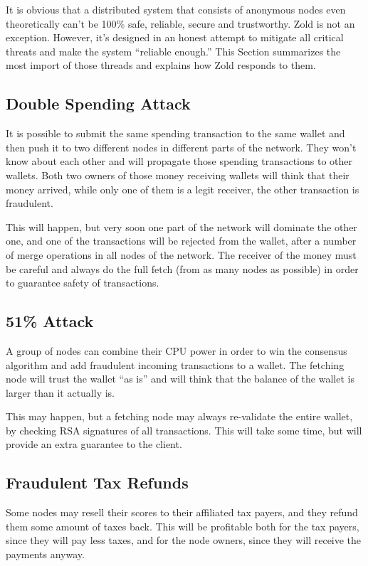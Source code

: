 \documentclass[11pt,oneside]{article}
\begin{document}
It is obvious that a distributed system that consists of anonymous nodes
even theoretically can't be 100\% safe, reliable, secure and trustworthy.
Zold is not an exception. However, it's designed in an honest attempt
to mitigate all critical threats and make the system ``reliable enough.''
This Section summarizes the most import of those threads and explains
how Zold responds to them.

\subsection{Double Spending Attack}

It is possible to submit the same spending transaction to the same wallet
and then push it to two different nodes in different parts of the network.
They won't know about each other and will propagate those spending
transactions to other wallets. Both two owners of those money receiving
wallets will think that their money arrived, while only one of them is
a legit receiver, the other transaction is fraudulent.

This will happen, but very soon one part of the network will dominate the other
one, and one of the transactions will be rejected from the wallet, after
a number of merge operations in all nodes of the network. The receiver of the
money must be careful and always do the full fetch (from as many nodes
as possible) in order to guarantee safety of transactions.

\subsection{51\% Attack}

A group of nodes can combine their CPU power in order to win the consensus
algorithm and add fraudulent incoming transactions to a wallet.
The fetching node will trust the wallet ``as is'' and will think that the
balance of the wallet is larger than it actually is.

This may happen, but a fetching node may always re-validate the entire wallet,
by checking RSA signatures of all transactions. This will take some time, but will
provide an extra guarantee to the client.

\subsection{Fraudulent Tax Refunds}

Some nodes may resell their scores to their affiliated tax payers, and they
refund them some amount of taxes back. This will be profitable both for
the tax payers, since they will pay less taxes, and for the node owners,
since they will receive the payments anyway.
\end{document}
